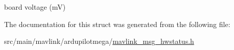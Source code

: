board voltage (m\+V) 



The documentation for this struct was generated from the following file\+:\begin{DoxyCompactItemize}
\item 
src/main/mavlink/ardupilotmega/\hyperlink{mavlink__msg__hwstatus_8h}{mavlink\+\_\+msg\+\_\+hwstatus.\+h}\end{DoxyCompactItemize}
